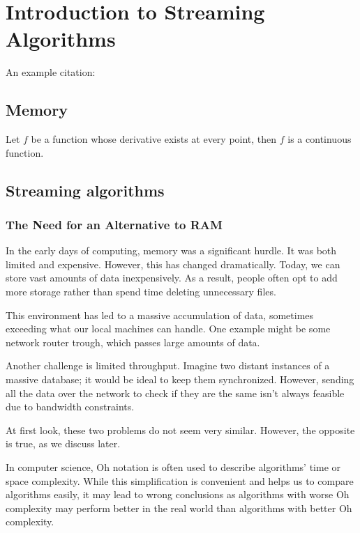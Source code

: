 \chapter{Introduction to Streaming Algorithms}

An example citation: \cite{Andel07}



\section{Memory}

\begin{defn}
\end{defn}

\begin{thm}
Let \(f\) be a function whose derivative exists at every point, then \(f\) is a continuous function.
\end{thm}

\section{Streaming algorithms}

\subsection{The Need for an Alternative to RAM}

In the early days of computing, memory was a significant hurdle. It was both limited and expensive. However, this has changed dramatically. Today, we can store vast amounts of data inexpensively. As a result, people often opt to add more storage rather than spend time deleting unnecessary files.

This environment has led to a massive accumulation of data, sometimes exceeding what our local machines can handle. One example might be some network router trough, which passes large amounts of data. 

Another challenge is limited throughput. Imagine two distant instances of a massive database; it would be ideal to keep them synchronized. However, sending all the data over the network to check if they are the same isn't always feasible due to bandwidth constraints. 

At first look, these two problems do not seem very similar. However, the opposite is true, as we discuss later.

In computer science, Oh notation is often used to describe algorithms' time or space complexity. While this simplification is convenient and helps us to compare algorithms easily, it may lead to wrong conclusions as algorithms with worse Oh complexity may perform better in the real world than algorithms with better Oh complexity.

